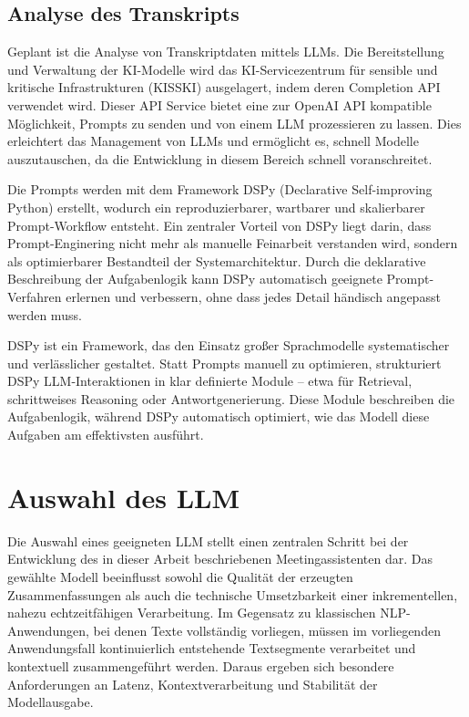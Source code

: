 \subsection{Analyse des Transkripts}
Geplant ist die Analyse von Transkriptdaten mittels LLMs. Die Bereitstellung und Verwaltung der KI-Modelle wird das KI-Servicezentrum für sensible und kritische Infrastrukturen (KISSKI) \cite{kisski} ausgelagert, indem deren Completion API verwendet wird. Dieser API Service bietet eine zur OpenAI API kompatible Möglichkeit, Prompts zu senden und von einem LLM prozessieren zu lassen. Dies erleichtert das Management von LLMs und ermöglicht es, schnell Modelle auszutauschen, da die Entwicklung in diesem Bereich schnell voranschreitet. 

Die Prompts werden mit dem Framework DSPy (Declarative Self-improving Python) erstellt, wodurch ein reproduzierbarer, wartbarer und skalierbarer Prompt-Workflow entsteht. Ein zentraler Vorteil von DSPy liegt darin, dass Prompt-Enginering nicht mehr als manuelle Feinarbeit verstanden wird, sondern als optimierbarer Bestandteil der Systemarchitektur. Durch die deklarative Beschreibung der Aufgabenlogik kann DSPy automatisch geeignete Prompt-Verfahren erlernen und verbessern, ohne dass jedes Detail händisch angepasst werden muss.

DSPy ist ein Framework, das den Einsatz großer Sprachmodelle systematischer und verlässlicher gestaltet. Statt Prompts manuell zu optimieren, strukturiert DSPy LLM-Interaktionen in klar definierte Module – etwa für Retrieval, schrittweises Reasoning oder Antwortgenerierung. Diese Module beschreiben die Aufgabenlogik, während DSPy automatisch optimiert, wie das Modell diese Aufgaben am effektivsten ausführt.


\section{Auswahl des LLM}
Die Auswahl eines geeigneten LLM stellt einen zentralen Schritt bei der Entwicklung des in dieser Arbeit beschriebenen Meetingassistenten dar. Das gewählte Modell beeinflusst sowohl die Qualität der erzeugten Zusammenfassungen als auch die technische Umsetzbarkeit einer inkrementellen, nahezu echtzeitfähigen Verarbeitung. Im Gegensatz zu klassischen NLP-Anwendungen, bei denen Texte vollständig vorliegen, müssen im vorliegenden Anwendungsfall kontinuierlich entstehende Textsegmente verarbeitet und kontextuell zusammengeführt werden. Daraus ergeben sich besondere Anforderungen an Latenz, Kontextverarbeitung und Stabilität der Modellausgabe. \cite{Zhang2024}


